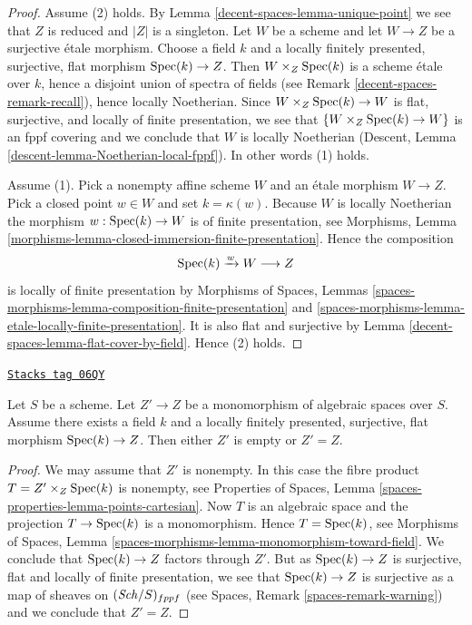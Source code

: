 \begin{proof}
Assume (2) holds. By
Lemma \ref{decent-spaces-lemma-unique-point}
we see that $Z$ is reduced and $|Z|$ is a singleton.
Let $W$ be a scheme and let $W \to Z$ be a surjective \'etale
morphism. Choose a field $k$ and a locally finitely presented, surjective,
flat morphism $\operatorname{Spec}(k) \to Z$.
Then $W \times_Z \operatorname{Spec}(k)$ is a scheme
\'etale over $k$, hence a disjoint union of spectra of fields
(see Remark \ref{decent-spaces-remark-recall}),
hence locally Noetherian. Since $W \times_Z \operatorname{Spec}(k) \to W$
is flat, surjective, and locally of finite presentation, we see
that $\{W \times_Z \operatorname{Spec}(k) \to W\}$ is an fppf covering
and we conclude that $W$ is locally Noetherian
(Descent, Lemma
\ref{descent-lemma-Noetherian-local-fppf}).
In other words (1) holds.

\medskip\noindent
Assume (1). Pick a nonempty affine scheme $W$ and an \'etale morphism
$W \to Z$. Pick a closed point $w \in W$ and set
$k = \kappa(w)$. Because $W$ is locally Noetherian the morphism
$w : \operatorname{Spec}(k) \to W$ is of finite presentation, see
Morphisms, Lemma \ref{morphisms-lemma-closed-immersion-finite-presentation}.
Hence the composition
$$
\operatorname{Spec}(k) \xrightarrow{w} W \longrightarrow Z
$$
is locally of finite presentation by
Morphisms of Spaces, Lemmas
\ref{spaces-morphisms-lemma-composition-finite-presentation} and
\ref{spaces-morphisms-lemma-etale-locally-finite-presentation}.
It is also flat and surjective by
Lemma \ref{decent-spaces-lemma-flat-cover-by-field}.
Hence (2) holds.
\end{proof}

\begin{lemma}
\label{decent-spaces-lemma-monomorphism-into-point}
\href{https://stacks.math.columbia.edu/tag/06QY}{\texttt{Stacks tag 06QY}}

Let $S$ be a scheme.
Let $Z' \to Z$ be a monomorphism of algebraic spaces over $S$.
Assume there exists a field $k$ and a locally finitely presented, surjective,
flat morphism $\operatorname{Spec}(k) \to Z$. Then either $Z'$
is empty or $Z' = Z$.
\end{lemma}

\begin{proof}
We may assume that $Z'$ is nonempty. In this case the
fibre product $T = Z' \times_Z \operatorname{Spec}(k)$
is nonempty, see
Properties of Spaces, Lemma \ref{spaces-properties-lemma-points-cartesian}.
Now $T$ is an algebraic space and the projection $T \to \operatorname{Spec}(k)$
is a monomorphism. Hence $T = \operatorname{Spec}(k)$, see
Morphisms of Spaces, Lemma
\ref{spaces-morphisms-lemma-monomorphism-toward-field}.
We conclude that $\operatorname{Spec}(k) \to Z$ factors through $Z'$.
But as $\operatorname{Spec}(k) \to Z$ is surjective, flat and locally of finite
presentation, we see that $\operatorname{Spec}(k) \to Z$ is surjective as a
map of sheaves on $(\mathit{Sch}/S)_{fppf}$ (see
Spaces, Remark \ref{spaces-remark-warning})
and we conclude that $Z' = Z$.
\end{proof}

